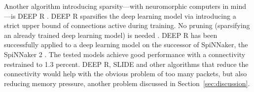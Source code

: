 \documentclass[]{article}
\begin{document}
Another algorithm introducing sparsity---with neuromorphic computers
in mind---is DEEP R \citep{bellec_et_al_2017}.
DEEP R sparsifies the deep learning model via introducing a strict
upper bound of connections active during training.
No pruning (sparsifying an already trained deep learning model)
is needed \citep{bellec_et_al_2017}.
DEEP R has been successfully applied to a deep learning model on the
successor of SpiNNaker, the SpiNNaker 2 \citep{liu_et_al_2018}.
The tested models achieve good performance with a connectivity
restrained to 1.3 percent.
DEEP R, SLIDE and other algorithms that reduce the connectivity would
help with the obvious problem of too many packets, but also reducing
memory pressure, another problem discussed in
Section~\ref{sec:discussion}.





\end{document}
